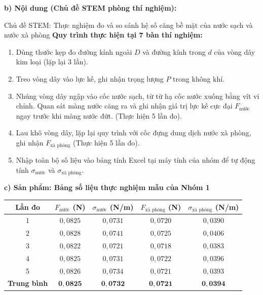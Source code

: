 \documentclass[12pt, a4paper]{article}
\begin{document}
\noindent \textbf{b) Nội dung (Chủ đề STEM phòng thí nghiệm):}
\begin{stembox}{Chủ đề STEM: Thực nghiệm đo và so sánh hệ số căng bề mặt của nước sạch và nước xà phòng}
    \textbf{Quy trình thực hiện tại 7 bàn thí nghiệm:}
    \begin{enumerate}
        \item Dùng thước kẹp đo đường kính ngoài $D$ và đường kính trong $d$ của vòng dây kim loại (lặp lại 3 lần).
        \item Treo vòng dây vào lực kế, ghi nhận trọng lượng $P$ trong không khí.
        \item Nhúng vòng dây ngập vào cốc nước sạch, từ từ hạ cốc nước xuống bằng vít vi chỉnh. Quan sát màng nước căng ra và ghi nhận giá trị lực kế cực đại $F_{\text{nước}}$ ngay trước khi màng nước đứt. (Thực hiện 5 lần đo).
        \item Lau khô vòng dây, lặp lại quy trình với cốc đựng dung dịch nước xà phòng, ghi nhận $F_{\text{xà phòng}}$ (Thực hiện 5 lần đo).
        \item Nhập toàn bộ số liệu vào bảng tính Excel tại máy tính của nhóm để tự động tính $\sigma_{\text{nước}}$ và $\sigma_{\text{xà phòng}}$.
    \end{enumerate}
\end{stembox}

\noindent \textbf{c) Sản phẩm: Bảng số liệu thực nghiệm mẫu của Nhóm 1}

\begin{center}
\renewcommand{\arraystretch}{1.2}
\begin{tabular}{|c|c|c|c|c|}
    \hline
    \textbf{Lần đo} & \textbf{$F_{\text{nước}}$ (N)} & \textbf{$\sigma_{\text{nước}}$ (N/m)} & \textbf{$F_{\text{xà phòng}}$ (N)} & \textbf{$\sigma_{\text{xà phòng}}$ (N/m)} \\
    \hline
    1 & $0{,}0825$ & $0{,}0731$ & $0{,}0720$ & $0{,}0390$ \\
    \hline
    2 & $0{,}0828$ & $0{,}0741$ & $0{,}0725$ & $0{,}0406$ \\
    \hline
    3 & $0{,}0822$ & $0{,}0721$ & $0{,}0718$ & $0{,}0383$ \\
    \hline
    4 & $0{,}0825$ & $0{,}0731$ & $0{,}0722$ & $0{,}0396$ \\
    \hline
    5 & $0{,}0826$ & $0{,}0734$ & $0{,}0721$ & $0{,}0393$ \\
    \hline
    \textbf{Trung bình} & $\mathbf{0{,}0825}$ & $\mathbf{0{,}0732}$ & $\mathbf{0{,}0721}$ & $\mathbf{0{,}0394}$ \\
    \hline
\end{tabular}
\end{center}
\end{document}
